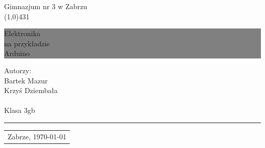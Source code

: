 \documentclass[a4paper,12pt, twoside]{article}
\newcommand{\HRule}[1]{\hfill \rule{0.2\linewidth}{#1}} %
\begin{document}

\begin{titlepage}
\small Gimnazjum nr 3 w Zabrzu\\
\line(1,0){431}\\
\colorbox{grey}{
	\parbox[t]{1.0\linewidth}{
		\centering \fontsize{50pt}{80pt}\selectfont %
		\vspace*{0.7cm} %
		
		\hfill Elektronika \\
		\hfill na przykładzie \\
		\hfill Arduino \\

		\vspace*{0.7cm} %
	}
}

\vfill %


{\centering \large 
\hfill Autorzy: \\
\hfill Bartek Mazur \\
\hfill Krzyś Dziembała \\
\hfill \\
\hfill Klasa 3gb\\

\HRule{1pt}} %


\begin{center}
	\begin{tabular}{r}
	\small Zabrze, \today
	\end{tabular}
\end{center}
\hfill
\clearpage %

\end{titlepage}
\end{document}
